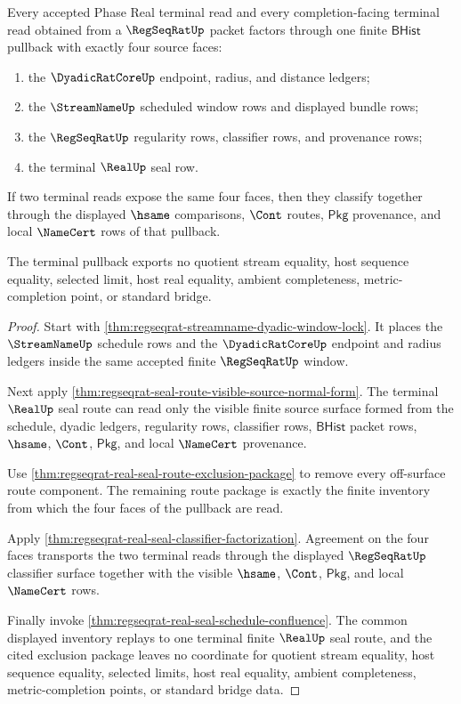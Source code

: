\begin{theorem}
\label{thm:regseqrat-four-face-terminal-pullback}
Every accepted Phase Real terminal read and every completion-facing terminal
read obtained from a $\RegSeqRatUp$ packet factors through one finite
$\mathsf{BHist}$ pullback with exactly four source faces:
\begin{enumerate}
\item the $\DyadicRatCoreUp$ endpoint, radius, and distance ledgers;
\item the $\StreamNameUp$ scheduled window rows and displayed bundle rows;
\item the $\RegSeqRatUp$ regularity rows, classifier rows, and provenance
rows;
\item the terminal $\RealUp$ seal row.
\end{enumerate}
If two terminal reads expose the same four faces, then they classify together
through the displayed $\hsame$ comparisons, $\Cont$ routes, $\mathsf{Pkg}$
provenance, and local $\NameCert$ rows of that pullback.

The terminal pullback exports no quotient stream equality, host sequence
equality, selected limit, host real equality, ambient completeness,
metric-completion point, or standard bridge.
\end{theorem}
\begin{proof}
Start with \autoref{thm:regseqrat-streamname-dyadic-window-lock}. It places
the $\StreamNameUp$ schedule rows and the $\DyadicRatCoreUp$ endpoint and
radius ledgers inside the same accepted finite $\RegSeqRatUp$ window.

Next apply \autoref{thm:regseqrat-seal-route-visible-source-normal-form}. The
terminal $\RealUp$ seal route can read only the visible finite source surface
formed from the schedule, dyadic ledgers, regularity rows, classifier rows,
$\mathsf{BHist}$ packet rows, $\hsame$, $\Cont$, $\mathsf{Pkg}$, and local
$\NameCert$ provenance.

Use \autoref{thm:regseqrat-real-seal-route-exclusion-package} to remove every
off-surface route component. The remaining route package is exactly the
finite inventory from which the four faces of the pullback are read.

Apply \autoref{thm:regseqrat-real-seal-classifier-factorization}. Agreement on
the four faces transports the two terminal reads through the displayed
$\RegSeqRatUp$ classifier surface together with the visible $\hsame$, $\Cont$,
$\mathsf{Pkg}$, and local $\NameCert$ rows.

Finally invoke \autoref{thm:regseqrat-real-seal-schedule-confluence}. The
common displayed inventory replays to one terminal finite $\RealUp$ seal
route, and the cited exclusion package leaves no coordinate for quotient
stream equality, host sequence equality, selected limits, host real equality,
ambient completeness, metric-completion points, or standard bridge data.
\end{proof}

